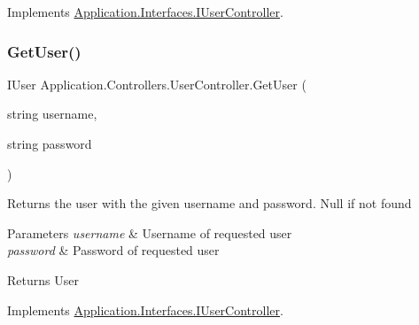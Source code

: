 Implements \mbox{\hyperlink{interface_application_1_1_interfaces_1_1_i_user_controller_aca064ba3a4c3c2d0dd1339b8a4995e86}{Application.\+Interfaces.\+I\+User\+Controller}}.

\mbox{\label{class_application_1_1_controllers_1_1_user_controller_adb2565915559692fae6a146d23d5fe01}} 
\subsubsection{\texorpdfstring{Get\+User()}{GetUser()}}
{\footnotesize\ttfamily I\+User Application.\+Controllers.\+User\+Controller.\+Get\+User (\begin{DoxyParamCaption}\item[{string}]{username,  }\item[{string}]{password }\end{DoxyParamCaption})}



Returns the user with the given username and password. Null if not found 


\begin{DoxyParams}{Parameters}
{\em username} & Username of requested user\\
\hline
{\em password} & Password of requested user\\
\hline
\end{DoxyParams}
\begin{DoxyReturn}{Returns}
User
\end{DoxyReturn}


Implements \mbox{\hyperlink{interface_application_1_1_interfaces_1_1_i_user_controller_afdea9f68822192392d4b973e300f56af}{Application.\+Interfaces.\+I\+User\+Controller}}.

\mbox{\label{class_application_1_1_controllers_1_1_user_controller_af509b1d73f3a654edfb48dcc1f623ca8}} 
